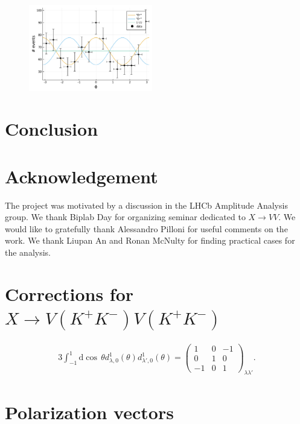 \documentclass[prd,preprintnumbers,floatfix,
nofootinbib,superscriptaddress]{revtex4}
\newcommand{\diff}{\mathrm{d}}
\begin{document}
\begin{figure}
  \includegraphics[width=0.48\textwidth]{../plots/phi_higgs.pdf}
  \caption{}
  \label{fig:higgs.phi}
\end{figure}

\section{Conclusion}


\section*{Acknowledgement}
The project was motivated by a discussion in the LHCb Amplitude Analysis group.
We thank Biplab Day for organizing seminar dedicated to $X\to VV$.
We would like to gratefully thank Alessandro Pilloni for useful comments on the work.
We thank Liupan An and Ronan McNulty for finding practical cases for the analysis.

\appendix

\section{Corrections for $X\to V(K^+K^-)V(K^+K^-)$}
\begin{align}
  3 \int_{-1}^{1} \diff \cos\,\theta d_{\lambda,0}^{1}(\theta) d_{\lambda',0}^{1}(\theta) =
  \begin{pmatrix}1 & 0 & -1\\0 & 1 & 0\\-1 & 0 & 1\end{pmatrix}_{\lambda\lambda'}.
\end{align}

\section{Polarization vectors}
\end{document}
